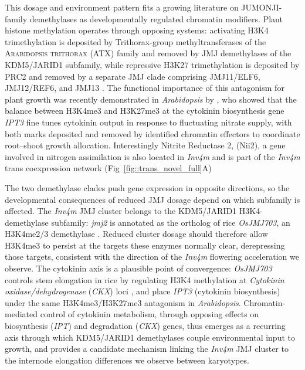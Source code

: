 \documentclass[9pt,twocolumn,twoside]{rilabRxiv}
\newcommand{\invfour}{\textit{Inv4m}\xspace}
\begin{document}
This dosage and environment pattern fits a growing literature on JUMONJI-family demethylases as developmentally regulated chromatin modifiers. 
Plant histone methylation operates through opposing systems: activating H3K4 trimethylation is deposited by Trithorax-group methyltransferases of the \textsc{Arabidopsis trithorax} (ATX) family \citep{Alvarez-Venegas2003-sy} and removed by JMJ demethylases of the KDM5/JARID1 subfamily, while repressive H3K27 trimethylation is deposited by PRC2 and removed by a separate JMJ clade comprising JMJ11/ELF6, JMJ12/REF6, and JMJ13 \citep{Lu2011-ie, Gan2015-xi}. 
The functional importance of this antagonism for plant growth was recently demonstrated in \textit{Arabidopsis} by \citet{bellegarde2025}, who showed that the balance between H3K4me3 and H3K27me3 at the cytokinin biosynthesis gene \textit{IPT3} fine tunes cytokinin output in response to fluctuating nitrate supply, with both marks deposited and removed by identified chromatin effectors to coordinate root--shoot growth allocation.
Interestingly Nitrite Reductase 2, (Nii2), a gene involved in nitrogen assimilation is also located in \invfour and is part of the \invfour trans coexpression network (Fig~\ref{fig::trans_novel_full}A)

The two demethylase clades push gene expression in opposite directions, so the developmental consequences of reduced JMJ dosage depend on which subfamily is affected.
The \invfour JMJ cluster belongs to the KDM5/JARID1 H3K4-demethylase subfamily: \textit{jmj2} is annotated as the ortholog of rice \textit{OsJMJ703}, an H3K4me2/3 demethylase \citep{chen2013}. 
Reduced cluster dosage should therefore allow H3K4me3 to persist at the targets these enzymes normally clear, derepressing those targets, consistent with the direction of the \invfour flowering acceleration we observe. 
The cytokinin axis is a plausible point of convergence: \textit{OsJMJ703} controls stem elongation in rice by regulating H3K4 methylation at \textit{Cytokinin oxidase/dehydrogenase} (\textit{CKX}) loci \citep{chen2013}, and \citet{bellegarde2025} place \textit{IPT3} (cytokinin biosynthesis) under the same H3K4me3/H3K27me3 antagonism in \textit{Arabidopsis}. 
Chromatin-mediated control of cytokinin metabolism, through opposing effects on biosynthesis (\textit{IPT}) and degradation (\textit{CKX}) genes, thus emerges as a recurring axis through which KDM5/JARID1 demethylases couple environmental input to growth, and provides a candidate mechanism linking the \invfour JMJ cluster to the internode elongation differences we observe between karyotypes.
\end{document}
